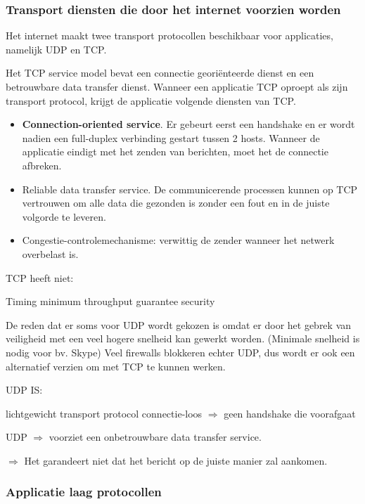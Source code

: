 \subsubsection{Transport diensten die door het internet voorzien worden}

Het internet maakt twee transport protocollen beschikbaar voor applicaties, namelijk UDP en TCP.


Het TCP service model bevat een connectie georiënteerde dienst en een betrouwbare data transfer dienst. Wanneer een applicatie TCP oproept als zijn transport protocol, krijgt de applicatie volgende diensten van TCP.
\begin{itemize}
    \item \textbf{Connection-oriented service}. 
    Er gebeurt eerst een handshake en er wordt nadien een full-duplex verbinding gestart tussen 2 hosts. Wanneer de applicatie eindigt met het zenden van berichten, moet het de connectie afbreken.
    \item Reliable data transfer service. De communicerende processen kunnen op TCP vertrouwen om alle data die gezonden is zonder een fout en in de juiste volgorde te leveren.
    \item Congestie-controlemechanisme: verwittig de zender wanneer het netwerk overbelast is.
\end{itemize}

\noindent TCP heeft niet:

\bi
\itf Timing
\itf minimum throughput guarantee
\itf security
\ei


De reden dat er soms voor UDP wordt gekozen is omdat er door het gebrek van veiligheid met een veel hogere snelheid kan gewerkt worden. (Minimale snelheid is nodig voor bv. Skype) Veel firewalls blokkeren echter UDP, dus wordt er ook een alternatief verzien om met TCP te kunnen werken.

UDP IS:

\bi
\itf lichtgewicht transport protocol
\itf connectie-loos $\Rightarrow$ geen handshake die voorafgaat 
\ei

\noindent UDP $\Rightarrow$ voorziet een onbetrouwbare data transfer service.

$\Rightarrow$ Het garandeert niet dat het bericht op de juiste manier zal aankomen.

\subsubsection{Applicatie laag protocollen}

